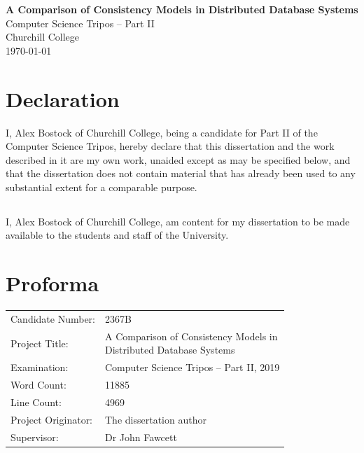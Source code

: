 \documentclass[12pt,a4paper,twoside,openany]{report}
\begin{document}





\pagestyle{empty}


\vspace*{60mm}
\begin{center}
\Huge
\textbf{A Comparison of Consistency Models in Distributed Database Systems} \\[5mm]
Computer Science Tripos -- Part II \\[5mm]
Churchill College \\[5mm]
\today  %
\end{center}


\pagestyle{plain}

\chapter*{Declaration}

I, Alex Bostock of Churchill College,
being a candidate for Part II of the Computer Science Tripos,
hereby declare that this dissertation and the work described in it
are my own work, unaided except as may be specified below, and
that the dissertation does not contain material that has already
been used to any substantial extent for a comparable purpose.

\section*{}

I, Alex Bostock of Churchill College,
am content for my dissertation to be made available to the students and staff of the University. 

\chapter*{Proforma}

{\large
\begin{tabular}{ll}
Candidate Number:   & 2367B \\
Project Title:      & \makecell[tl]{A Comparison of Consistency Models in \\ Distributed Database Systems}\\
Examination:        & Computer Science Tripos -- Part II, 2019  \\
Word Count:         & 11885 \\ %
Line Count:         & 4969 \\
Project Originator: & The dissertation author \\
Supervisor:         & Dr John Fawcett                    \\ 
\end{tabular}
}
\end{document}
